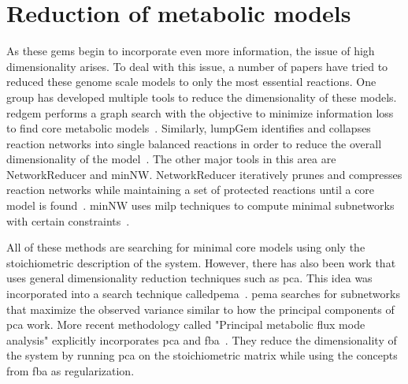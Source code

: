 
\section{Reduction of metabolic models}
As these \glspl{gem} begin to incorporate even more information, the issue of high dimensionality arises.
To deal with this issue, a number of papers have tried to reduced these genome scale models to only the most essential reactions.
One group has developed multiple tools to reduce the dimensionality of these models.
red\gls{gem} performs a graph search with the objective to minimize information loss to find core metabolic models~\cite{ataman2017redgem}.
Similarly, lumpGem identifies and collapses reaction networks into single balanced reactions in order to reduce the overall dimensionality of the model~\cite{ataman2017lumpgem}.
The other major tools in this area are NetworkReducer and minNW.
NetworkReducer iteratively prunes and compresses reaction networks while maintaining a set of protected reactions until a core model is found~\cite{erdrich2015algorithm}.
minNW uses \gls{milp} techniques to compute minimal subnetworks with certain constraints~\cite{rohl2017mixed}.

All of these methods are searching for minimal core models using only the stoichiometric description of the system.
However, there has also been work that uses general dimensionality reduction techniques such as \gls{pca}.
This idea was incorporated into a search technique called\gls{pema}~\cite{von2016principal}.
\gls{pema} searches for subnetworks that maximize the observed variance similar to how the principal components of \gls{pca} work.
More recent methodology called "Principal metabolic flux mode analysis" explicitly incorporates \gls{pca} and \gls{fba}~\cite{bhadra2017principal}.
They reduce the dimensionality of the system by running \gls{pca} on the stoichiometric matrix while using the concepts from \gls{fba} as regularization.


